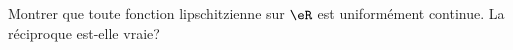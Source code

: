 
\begin{exercice}\label{exo0100}

Montrer que toute fonction lipschitzienne sur $\eR$ est uniformément continue. La réciproque est-elle vraie? 

\end{exercice}
